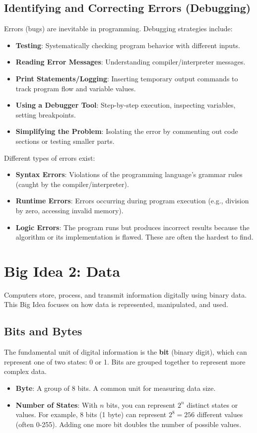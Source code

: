 \documentclass[11pt,oneside]{book}
\begin{document}
\section{Identifying and Correcting Errors (Debugging)}
\label{sec:debugging}
Errors (bugs) are inevitable in programming. Debugging strategies include:
\begin{itemize}
    \item \textbf{Testing}: Systematically checking program behavior with different inputs.
    \item \textbf{Reading Error Messages}: Understanding compiler/interpreter messages.
    \item \textbf{Print Statements/Logging}: Inserting temporary output commands to track program flow and variable values.
    \item \textbf{Using a Debugger Tool}: Step-by-step execution, inspecting variables, setting breakpoints.
    \item \textbf{Simplifying the Problem}: Isolating the error by commenting out code sections or testing smaller parts.
\end{itemize}
Different types of errors exist:
\begin{itemize}
    \item \textbf{Syntax Errors}: Violations of the programming language's grammar rules (caught by the compiler/interpreter).
    \item \textbf{Runtime Errors}: Errors occurring during program execution (e.g., division by zero, accessing invalid memory).
    \item \textbf{Logic Errors}: The program runs but produces incorrect results because the algorithm or its implementation is flawed. These are often the hardest to find.
\end{itemize}
\chapter{Big Idea 2: Data}
\label{chap:data}
Computers store, process, and transmit information digitally using binary data. This Big Idea focuses on how data is represented, manipulated, and used.

\section{Bits and Bytes}
\label{sec:bits_bytes}
The fundamental unit of digital information is the \textbf{bit} (binary digit), which can represent one of two states: 0 or 1. Bits are grouped together to represent more complex data.
\begin{itemize}
    \item \textbf{Byte}: A group of 8 bits. A common unit for measuring data size.
    \item \textbf{Number of States}: With $n$ bits, you can represent $2^n$ distinct states or values. For example, 8 bits (1 byte) can represent $2^8 = 256$ different values (often 0-255). Adding one more bit doubles the number of possible values.
\end{itemize}
\end{document}
